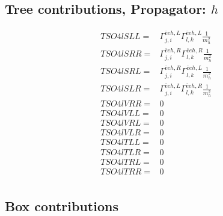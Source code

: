 \documentclass[A4,landscape]{article}
\begin{document}
\subsection{Tree contributions, Propagator: $h$} 

\begin{align} 
  TSO4lSLL= & \Gamma^{\bar{e}e h ,L}_{j, i} \Gamma^{\bar{e}e h ,L}_{l, k} \frac{1}{m^2_{h}} \\ 
  TSO4lSRR= & \Gamma^{\bar{e}e h ,R}_{j, i} \Gamma^{\bar{e}e h ,R}_{l, k} \frac{1}{m^2_{h}} \\ 
  TSO4lSRL= & \Gamma^{\bar{e}e h ,R}_{j, i} \Gamma^{\bar{e}e h ,L}_{l, k} \frac{1}{m^2_{h}} \\ 
  TSO4lSLR= & \Gamma^{\bar{e}e h ,L}_{j, i} \Gamma^{\bar{e}e h ,R}_{l, k} \frac{1}{m^2_{h}} \\ 
  TSO4lVRR= & 0 \\ 
  TSO4lVLL= & 0 \\ 
  TSO4lVRL= & 0 \\ 
  TSO4lVLR= & 0 \\ 
  TSO4lTLL= & 0 \\ 
  TSO4lTLR= & 0 \\ 
  TSO4lTRL= & 0 \\ 
  TSO4lTRR= & 0 \\ 
\end{align} 
\subsection{Box contributions} 
\end{document}
